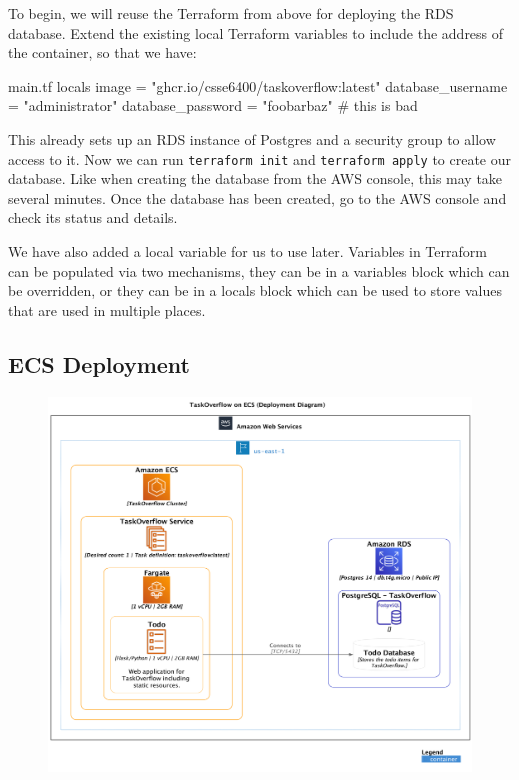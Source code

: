 \documentclass{csse4400}
\begin{document}
To begin, we will reuse the Terraform from above for deploying the RDS database.
Extend the existing local Terraform variables to include the address of the container, so that we have:

\begin{code}[language=terraform,numbers=none]{main.tf}
locals {
  image             = "ghcr.io/csse6400/taskoverflow:latest"
  database_username = "administrator"
  database_password = "foobarbaz" # this is bad
}
\end{code}

This already sets up an RDS instance of Postgres and a security group to allow access to it.
Now we can run \texttt{terraform init} and \texttt{terraform apply} to create our database.
Like when creating the database from the AWS console, this may take several minutes.
Once the database has been created, go to the AWS console and check its status and details.

We have also added a local variable for us to use later.
Variables in Terraform can be populated via two mechanisms,
they can be in a variables block which can be overridden,
or they can be in a locals block which can be used to store values that are used in multiple places.

\subsection{ECS Deployment}
\label{pathb}

\begin{figure}[H]
  \includegraphics[trim=0 230 0 0,clip,width=\textwidth]{diagrams/ecsdeployment}
\end{figure}
\end{document}
